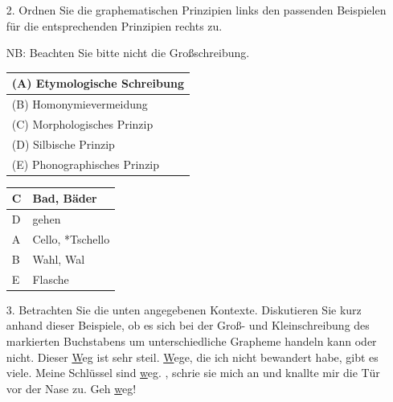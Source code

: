 {%
\begin{frame}

	\begin{itemize}
		\item[2.] Ordnen Sie die graphematischen Prinzipien links den passenden Beispielen für die entsprechenden Prinzipien rechts zu.
		
		NB: Beachten Sie bitte nicht die Großschreibung.
		 
		\vspace{.5cm}
		 		
			\begin{minipage}{0.45\textwidth}
				\centering
				\begin{tabular}{|l|}
					\hline
					(A) Etymologische Schreibung\\
					\hline
					(B) Homonymievermeidung\\
					\hline
					(C) Morphologisches Prinzip\\
					\hline
					(D) Silbische Prinzip\\
					\hline
					(E) Phonographisches Prinzip\\
					\hline
				\end{tabular}
			\end{minipage}
			\hfill%
			\begin{minipage}{0.45\textwidth}
				\centering
				\begin{tabular}{|p{}|l|}
					\hline
					C & Bad, Bäder \\
					\hline
					D & gehen \\
					\hline
					A & Cello, *Tschello \\
					\hline
					B & Wahl, Wal\\
					\hline
					E & Flasche \\
					\hline
				\end{tabular}
			\end{minipage}

	\end{itemize}
\end{frame}


\begin{frame}[allowframebreaks]
	\begin{itemize}
		\item[3.] Betrachten Sie die unten angegebenen Kontexte. Diskutieren Sie kurz anhand dieser Beispiele, ob es sich bei der Groß- und Kleinschreibung des markierten Buchstabens um unterschiedliche Grapheme handeln kann oder nicht.
		\eal
		\ex Dieser \underline{W}eg ist sehr steil.
		\ex \underline{W}ege, die ich nicht bewandert habe, gibt es viele.
		\ex Meine Schlüssel sind \underline{w}eg.
		\ex {}, schrie sie mich an und knallte mir die Tür vor der Nase zu.
		\ex Geh \underline{w}eg!
		\zl
		


\end{itemize}
\end{frame}}
